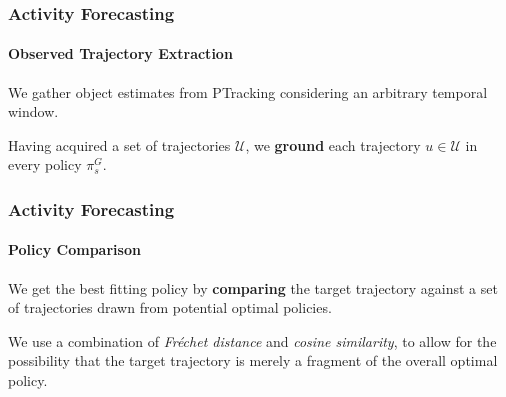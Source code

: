 \begin{frame}
	\frametitle{Activity Forecasting}
	\framesubtitle{Observed Trajectory Extraction}
	
	\Large
	
	\vspace{0.4cm}
	
	We gather object estimates from PTracking considering an arbitrary temporal window. \\
	
	\vspace{0.4cm}
	
	Having acquired a set of trajectories $ \mathcal{U} $, we \textbf{ground} each
	trajectory $ u \in \mathcal{U} $ in every policy $ \pi_s^G $. \\
\end{frame}

\begin{frame}
	\frametitle{Activity Forecasting}
	\framesubtitle{Policy Comparison}
	
	\Large
	
	\vspace{0.1cm}
	
	We get the best fitting policy by \textbf{comparing} the target trajectory against a
	set of trajectories drawn from potential optimal policies. \\
	
	\vspace{0.4cm}
	
	We use a combination of \emph{Fr\'echet distance} and \emph{cosine similarity}, to
	allow for the possibility that the target trajectory is merely a fragment of the
	overall optimal policy. \\
\end{frame}

